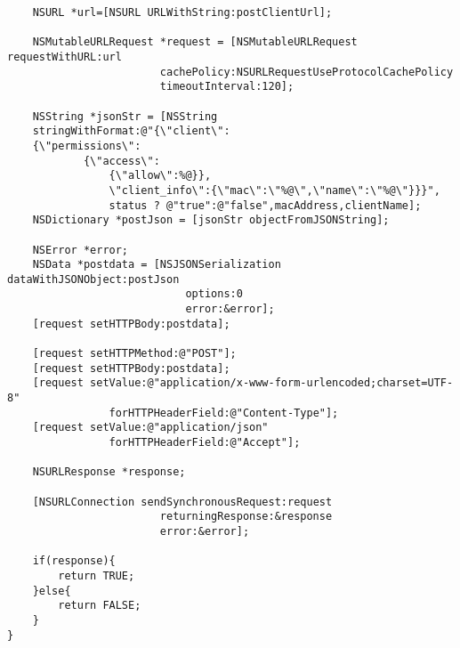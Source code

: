 \begin{appendices}
\begin{algorithm}[h]
\begin{verbatim}
    NSURL *url=[NSURL URLWithString:postClientUrl];
    
    NSMutableURLRequest *request = [NSMutableURLRequest requestWithURL:url
     					cachePolicy:NSURLRequestUseProtocolCachePolicy 
     					timeoutInterval:120];
    
    NSString *jsonStr = [NSString 
    stringWithFormat:@"{\"client\":
    {\"permissions\":
    		{\"access\":
    			{\"allow\":%@}},
    			\"client_info\":{\"mac\":\"%@\",\"name\":\"%@\"}}}",
    			status ? @"true":@"false",macAddress,clientName];
    NSDictionary *postJson = [jsonStr objectFromJSONString];
    
    NSError *error;
    NSData *postdata = [NSJSONSerialization dataWithJSONObject:postJson 
    						options:0 
    						error:&error];
    [request setHTTPBody:postdata];
    
    [request setHTTPMethod:@"POST"];
    [request setHTTPBody:postdata];
    [request setValue:@"application/x-www-form-urlencoded;charset=UTF-8" 
    			forHTTPHeaderField:@"Content-Type"];
    [request setValue:@"application/json" 
    			forHTTPHeaderField:@"Accept"];
    
    NSURLResponse *response;
    
    [NSURLConnection sendSynchronousRequest:request 
    					returningResponse:&response 
    					error:&error];
    
    if(response){
        return TRUE;
    }else{
        return FALSE;
    }
}

 \end{verbatim}
\end{algorithm}

\end{appendices}